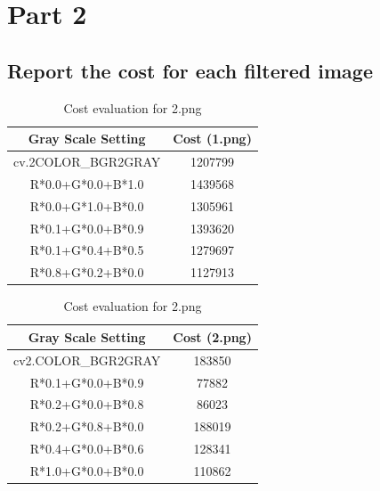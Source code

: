 \documentclass[a4paper, 12pt]{article}
\begin{document}
\section{Part 2}
\subsection{Report the cost for each filtered image}
\begin{table}[!htb]
    \centering
    \begin{minipage}{.5\linewidth}
        \caption{Cost evaluation for 1.png}
        \centering
        \begin{tabular}{|c|c|}
            \hline
            Gray Scale Setting  & Cost (1.png) \\
            \hline
            cv.2COLOR\_BGR2GRAY & 1207799      \\
            \hline
            R*0.0+G*0.0+B*1.0   & 1439568      \\
            \hline
            R*0.0+G*1.0+B*0.0   & 1305961      \\
            \hline
            R*0.1+G*0.0+B*0.9   & 1393620      \\
            \hline
            R*0.1+G*0.4+B*0.5   & 1279697      \\
            \hline
            R*0.8+G*0.2+B*0.0   & 1127913      \\
            \hline
        \end{tabular}
    \end{minipage}%
    \begin{minipage}{.5\linewidth}
        \centering
        \caption{Cost evaluation for 2.png}
        \begin{tabular}{|c|c|}
            \hline
            Gray Scale Setting  & Cost (2.png) \\
            \hline
            cv2.COLOR\_BGR2GRAY & 183850       \\
            \hline
            R*0.1+G*0.0+B*0.9   & 77882        \\
            \hline
            R*0.2+G*0.0+B*0.8   & 86023        \\
            \hline
            R*0.2+G*0.8+B*0.0   & 188019       \\
            \hline
            R*0.4+G*0.0+B*0.6   & 128341       \\
            \hline
            R*1.0+G*0.0+B*0.0   & 110862       \\
            \hline
        \end{tabular}
    \end{minipage}
\end{table}
\end{document}
